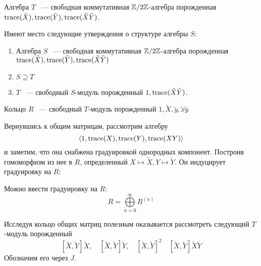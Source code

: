 \vskip 0.1in\noindent
\begin{proposition}
    Алгебра $T$ ~--- свободная коммутативная $\mathbb{Z}/2\mathbb{Z}$-алгебра порожденная $\mathrm{trace}(\tilde{X}), \mathrm{trace}(\tilde{Y}), \mathrm{trace}(\tilde{X}\tilde{Y})$.
\end{proposition}
\vskip 0.1in\noindent
\begin{proposition}
    Имеют место следующие утверждения о структуре алгебры $S$:
    \begin{enumerate}
        \item Алгебра $S$ ~--- свободная коммутативная $\mathbb{Z}/2\mathbb{Z}$-алгебра порожденная $\mathrm{trace}(\tilde{X}), \mathrm{trace}(\tilde{Y}), \mathrm{trace}(\tilde{X}\tilde{Y})$
        \item $S\supseteq T$
        \item $T$ ~--- свободный  $S$-модуль порожденный $1, \mathrm{trace}(\tilde{X}\tilde{Y})$.
    \end{enumerate}
\end{proposition}
\vskip 0.1in\noindent
\begin{proposition}
    Кольцо $R$ ~--- свободный $T$-модуль порожденный $1, \tilde{X}, \tilde{y}, \tilde{x}\tilde{y}$
\end{proposition}
\vskip 0.1in\noindent
Вернувшись к общим матрицам, рассмотрим алгебру
\[
    \langle 1, \mathrm{trace}(X), \mathrm{trace}(Y), \mathrm{trace}(XY) \rangle
\]
и заметим, что она снабжена градуировкой однородных компонент.
Построив гомоморфизм из нее в $R$, определенный $X\mapsto \tilde{X}, Y\mapsto\tilde{Y}$.
Он индуцирует градуировку на $R$:
\vskip 0.1in\noindent
\begin{proposition}
    Можно ввести градуировку на $R$:
    \[
        R = \bigoplus\limits_{n=0}^{\infty} R^{(n)}
    \]
\end{proposition}

Исследуя кольцо общих матриц полезным оказывается рассмотреть следующий $T$-модуль порожденный
\[
    [\tilde{X}, \tilde{Y}] \tilde{X}, \quad [\tilde{X}, \tilde{Y}] \tilde{Y}, \quad [\tilde{X}, \tilde{Y}]^2 \quad [\tilde{X}, \tilde{Y}]\tilde{X}\tilde{Y}
\]
Обозначим его через $J$.

